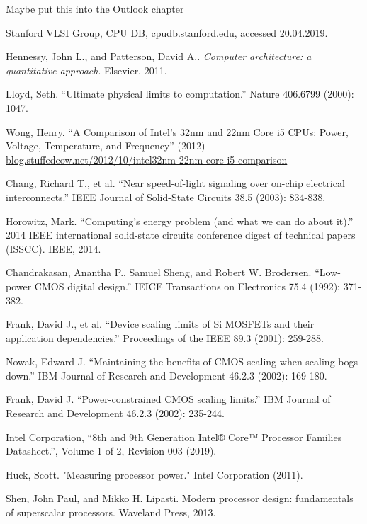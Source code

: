\documentclass[12pt,a4paper]{article}
\newcommand{\note}{\textcolor{WildStrawberry}}
\begin{document}
\note{Maybe put this into the Outlook chapter}

\newpage 
\thispagestyle{empty}
\begin{thebibliography}{56}    
    
    
    Stanford VLSI Group, CPU DB, \url{cpudb.stanford.edu}, accessed 20.04.2019.   
    
    Hennessy, John L., and Patterson, David A.. \textit{Computer architecture: a quantitative approach}. Elsevier, 2011.
    
    
	Lloyd, Seth. ``Ultimate physical limits to computation.'' Nature 406.6799 (2000): 1047.
    
    Wong, Henry. ``A Comparison of Intel’s 32nm and 22nm Core i5 CPUs: Power, Voltage, Temperature, and Frequency'' (2012)\\ \url{blog.stuffedcow.net/2012/10/intel32nm-22nm-core-i5-comparison}

	Chang, Richard T., et al. ``Near speed-of-light signaling over on-chip electrical interconnects.'' IEEE Journal of Solid-State Circuits 38.5 (2003): 834-838.
	
	Horowitz, Mark. ``Computing's energy problem (and what we can do about it).'' 2014 IEEE international solid-state circuits conference digest of technical papers (ISSCC). IEEE, 2014.
    
    Chandrakasan, Anantha P., Samuel Sheng, and Robert W. Brodersen. ``Low-power CMOS digital design.'' IEICE Transactions on Electronics 75.4 (1992): 371-382.
    
    Frank, David J., et al. ``Device scaling limits of Si MOSFETs and their application dependencies.'' Proceedings of the IEEE 89.3 (2001): 259-288.
    
    Nowak, Edward J. ``Maintaining the benefits of CMOS scaling when scaling bogs down.'' IBM Journal of Research and Development 46.2.3 (2002): 169-180.
    
    Frank, David J. ``Power-constrained CMOS scaling limits.'' IBM Journal of Research and Development 46.2.3 (2002): 235-244.
    
    Intel Corporation, ``8th and 9th Generation Intel® Core™ Processor Families Datasheet.'', Volume 1 of 2, Revision 003 (2019).
    
    Huck, Scott. "Measuring processor power." Intel Corporation (2011).
    
    Shen, John Paul, and Mikko H. Lipasti. Modern processor design: fundamentals of superscalar processors. Waveland Press, 2013.
\end{thebibliography}
\end{document}

